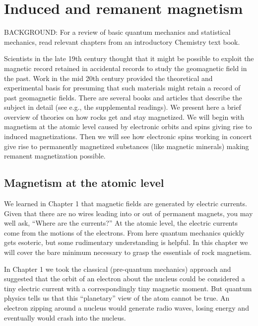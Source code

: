 


\chapter{Induced  and remanent magnetism}

{\parskip 0pt
\noindent BACKGROUND:   For a review of basic quantum mechanics and statistical mechanics, read relevant chapters from an introductory Chemistry text book.

\vskip 24pt


Scientists in the late 19th century thought that
it might be possible to exploit the magnetic record
retained in accidental records  to study the geomagnetic field in the past. 
Work in the mid 20th century provided  the theoretical and experimental basis
for presuming that such materials might retain a record of past geomagnetic
fields. There are
several books and articles that describe the subject in detail (see e.g.,
the supplemental readings).   We
present here a brief overview of theories on how rocks get and 
stay magnetized.  We will begin with magnetism at the atomic level caused by electronic orbits and spins giving rise to induced magnetizations.  Then we will see how electronic spins working in concert give rise to permanently magnetized substances (like magnetic minerals) making remanent magnetization possible.  

\section {Magnetism at the atomic level}
\label{sect:atomic}


We learned in Chapter 1  that magnetic fields are generated by electric currents.  Given that there are no wires leading into or out of permanent magnets, you may well  ask, ``Where are the currents?''  At the atomic level, the electric currents come from the motions of the electrons.  
From here quantum mechanics quickly gets esoteric, but  some rudimentary understanding is helpful.  In this chapter we will cover the bare minimum necessary to grasp the essentials of rock magnetism.   

In Chapter 1 we took the classical (pre-quantum mechanics) approach and suggested that the orbit of an electron about the nucleus could be considered a tiny electric current with a correspondingly tiny magnetic moment.  
But quantum physics
tells us that this ``planetary'' view of the atom  cannot be true.  An electron zipping around a nucleus would generate radio waves,  losing energy and  eventually would  crash into the nucleus.  

}
